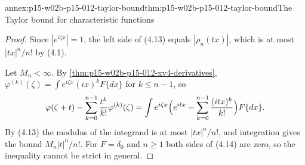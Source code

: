 \begin{annexitem}{annex:p15-w02b-p15-012-taylor-bound}{thm:p15-w02b-p15-012-taylor-bound}{The Taylor bound for characteristic functions}
\begin{proof}
Since \(|e^{i\zeta x}|=1\), the left side of (4.13) equals
\(|\rho_n(tx)|\), which is at most \(|tx|^n/n!\) by (4.1).

Let \(M_n<\infty\). By \cref{thm:p15-w02b-p15-012-xv4-derivatives},
\(\varphi^{(k)}(\zeta)=\int e^{i\zeta x}(ix)^kF\{dx\}\) for \(k\leq n-1\), so
\[
 \varphi(\zeta+t)-\sum_{k=0}^{n-1}\frac{t^k}{k!}\varphi^{(k)}(\zeta)
   =\int e^{i\zeta x}\Bigl(e^{itx}-\sum_{k=0}^{n-1}\frac{(itx)^k}{k!}\Bigr)F\{dx\}.
\]
By (4.13) the modulus of the integrand is at most \(|tx|^n/n!\), and
integration gives the bound \(M_n|t|^n/n!\). For \(F=\delta_0\) and
\(n\geq1\) both sides of (4.14) are zero, so the inequality cannot be strict
in general.
\end{proof}
\end{annexitem}

